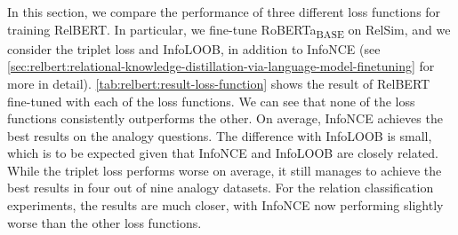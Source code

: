 \documentclass[3p]{elsarticle}
\begin{document}
{In this section, we compare the performance of three different loss functions for training RelBERT. In particular, we fine-tune RoBERTa\textsubscript{BASE} on RelSim, and we consider the triplet loss and InfoLOOB, in addition to InfoNCE (see \autoref{sec:relbert:relational-knowledge-distillation-via-language-model-finetuning} for more in detail). \autoref{tab:relbert:result-loss-function} shows the result of RelBERT fine-tuned with each of the loss functions. We can see that none of the loss functions consistently outperforms the other. On average, InfoNCE achieves the best results on the analogy questions. The difference with InfoLOOB is small, which is to be expected given that InfoNCE and InfoLOOB are closely related. While the triplet loss performs worse on average, it still manages to achieve the best results in four out of nine analogy datasets. For the relation classification experiments, the results are much closer, with InfoNCE now performing slightly worse than the other loss functions.

}
\end{document}
